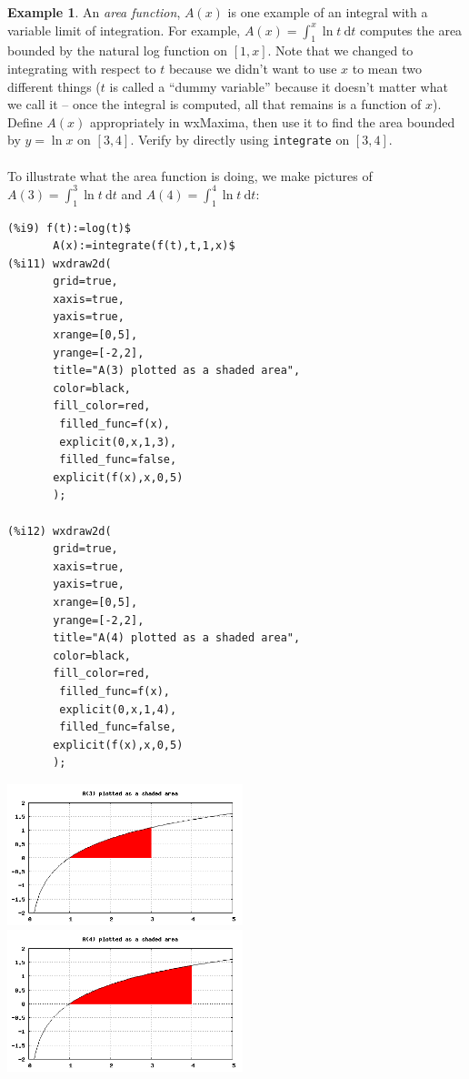 \documentclass[10.5pt,twoside]{report}
\theoremstyle{definition}
\newtheorem{exmp}{Example}[section]
\begin{document}
\begin{exmp} An \textit{area function}, $A(x)$ is one example of an integral with a variable limit of integration.  For example, $\displaystyle A(x)=\int_{1}^{x} \ln{t} \ \mathrm{d}t$ computes the area bounded by the natural log function on $[1,x]$.  Note that we changed to integrating with respect to $t$ because we didn't want to use $x$ to mean two different things ($t$ is called a ``dummy variable'' because it doesn't matter what we call it -- once the integral is computed, all that remains is a function of $x$).  Define $A(x)$ appropriately in wxMaxima, then use it to find the area bounded by $y=\ln{x}$ on $[3,4]$.  Verify by directly using \verb|integrate| on $[3,4]$.\\
${}$\\

To illustrate what the area function is doing, we make pictures of $\displaystyle A(3)=\int_{1}^{3} \ln{t} \ \mathrm{d}t$ and $\displaystyle A(4)=\int_{1}^{4} \ln{t} \ \mathrm{d}t$:

\begin{verbatim}
(%i9) f(t):=log(t)$
       A(x):=integrate(f(t),t,1,x)$
(%i11) wxdraw2d(
       grid=true,
       xaxis=true,
       yaxis=true,
       xrange=[0,5],
       yrange=[-2,2],
       title="A(3) plotted as a shaded area",
       color=black,
       fill_color=red,
        filled_func=f(x),
        explicit(0,x,1,3),
        filled_func=false,
       explicit(f(x),x,0,5)
       );

(%i12) wxdraw2d(
       grid=true,
       xaxis=true,
       yaxis=true,
       xrange=[0,5],
       yrange=[-2,2],
       title="A(4) plotted as a shaded area",
       color=black,
       fill_color=red,
        filled_func=f(x),
        explicit(0,x,1,4),
        filled_func=false,
       explicit(f(x),x,0,5)
       );
\end{verbatim}

\includegraphics[width=2.7in]{example_6_3_3_1}
\includegraphics[width=2.7in]{example_6_3_3_2}


\end{exmp}
\end{document}
